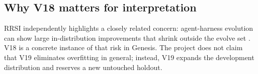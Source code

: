 \subsection{Why V18 matters for interpretation}

RRSI independently highlights a closely related concern: agent-harness evolution can show large in-distribution improvements that shrink outside the evolve set \cite{xia2026rrsi}. V18 is a concrete instance of that risk in Genesis. The project does not claim that V19 eliminates overfitting in general; instead, V19 expands the development distribution and reserves a new untouched holdout.

